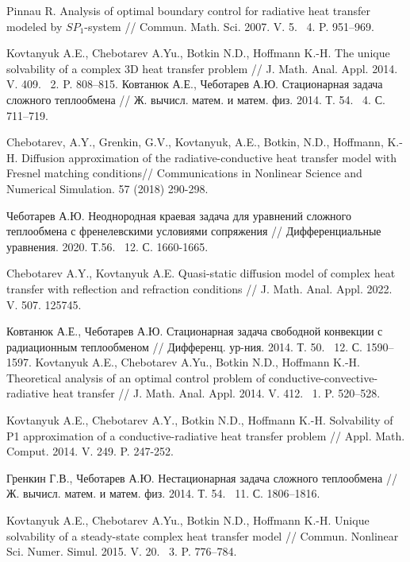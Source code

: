 \documentclass[12pt]{article}
\begin{document}
    \begin{thebibliography}{999}

Pinnau R. Analysis of optimal boundary control for radiative heat transfer modeled by $SP_1$-system //
Commun. Math. Sci. 2007. V. 5. \textnumero~4. P. 951--969.

Kovtanyuk A.E., Chebotarev A.Yu., Botkin N.D., Hoffmann K.-H. The unique solvability of a complex 3D heat transfer problem // J. Math. Anal. Appl. 2014. V. 409. \textnumero~2. P. 808--815.
Ковтанюк А.Е., Чеботарев А.Ю. Стационарная задача сложного теплообмена // Ж. вычисл. матем. и матем. физ. 2014. Т. 54. \textnumero~4. С. 711--719.

Chebotarev, A.Y., Grenkin, G.V., Kovtanyuk, A.E., Botkin, N.D., Hoffmann, K.-H. Diffusion approximation of the radiative-conductive heat transfer model with Fresnel matching conditions// Communications in Nonlinear Science and Numerical Simulation. 57 (2018) 290-298.

Чеботарев А.Ю. Неоднородная краевая задача для уравнений сложного теплообмена с френелевскими условиями сопряжения // Дифференциальные уравнения. 2020. Т.56. \textnumero~12. С. 1660-1665.

Chebotarev A.Y., Kovtanyuk A.E. Quasi-static diffusion model of complex heat transfer with reflection and refraction conditions // J. Math. Anal. Appl. 2022. V. 507. 125745. 

Ковтанюк А.Е., Чеботарев А.Ю. Стационарная задача свободной конвекции с радиационным теплообменом // Дифференц. ур-ния. 2014. Т. 50. \textnumero~12. С. 1590--1597.
Kovtanyuk A.E., Chebotarev A.Yu., Botkin N.D., Hoffmann K.-H. Theoretical analysis of an optimal control problem of conductive-convective-radiative heat transfer // J. Math. Anal.
Appl. 2014. V. 412. \textnumero~1. P. 520--528.

Kovtanyuk A.E., Chebotarev A.Y.,  Botkin N.D., Hoffmann K.-H.
Solvability of P1 approximation of a conductive-radiative heat transfer problem //
Appl. Math. Comput. 2014. V. 249. P. 247-252.

Гренкин Г.В., Чеботарев А.Ю. Нестационарная задача сложного теплообмена // Ж. вычисл. матем. и матем. физ. 2014. Т. 54. \textnumero~11. С. 1806--1816.

Kovtanyuk A.E., Chebotarev A.Yu., Botkin N.D., Hoffmann K.-H. Unique solvability of a steady-state complex heat transfer model // Commun. Nonlinear Sci. Numer. Simul. 2015. V. 20. \textnumero~3. P. 776--784.


\end{thebibliography}
\end{document}
